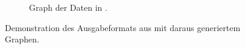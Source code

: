 \begin{figure}[ht]
\begin{subfigure}[c]{0.49\textwidth}
        \caption{
            Graph der Daten in .\label{fig:funkterm-beispielgraph}
        }
    \end{subfigure}
    \caption{Demonstration des Ausgabeformats aus  mit daraus generiertem Graphen.\label{fig:function-determination-raw-data}}
\end{figure}